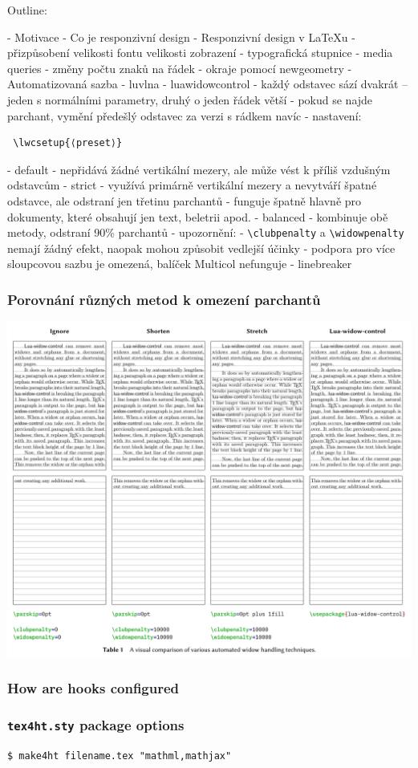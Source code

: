 
Outline:

- Motivace
- Co je responzivní design
- Responzivní design v LaTeXu
  - přizpůsobení velikosti fontu velikosti zobrazení
  - typografická stupnice
  - media queries
    - změny počtu znaků na řádek
    - okraje pomocí newgeometry
- Automatizovaná sazba
  - luvlna
  - luawidowcontrol
    - každý odstavec sází dvakrát -- jeden s normálními parametry, druhý o jeden řádek větší
    - pokud se najde parchant, vymění předešlý odstavec za verzi s rádkem navíc
    - nastavení:
 \begin{verbatim}
 \lwcsetup{⟨preset⟩}
 \end{verbatim}
      - default - nepřidává žádné vertikální mezery, ale může vést k příliš vzdušným odstavcům
      - strict - využívá primárně vertikální mezery a nevytváří špatné odstavce,  ale odstraní jen třetinu parchantů
        - funguje špatně hlavně pro dokumenty, které obsahují jen text, beletrii apod.
      - balanced - kombinuje obě metody, odstraní 90\% parchantů
    - upozornění:
      - \verb|\clubpenalty| a \verb|\widowpenalty| nemají žádný efekt, naopak mohou způsobit vedlejší účinky
      - podpora pro více sloupcovou sazbu je omezená, balíček Multicol nefunguje
  - linebreaker

 
\begin{frame}
  \frametitle{Porovnání různých metod k omezení parchantů}
  \begin{center}
  \includegraphics[height=.95\textheight]{img/lua-widow.pdf}
  \end{center}
\end{frame}



\begin{frame}
  \frametitle{How are hooks configured}
  \begin{itemize}

\end{itemize}
\end{frame}

\begin{frame}[fragile]
  \frametitle{\texttt{tex4ht.sty} package options}
  \begin{priklad}
\begin{verbatim}
$ make4ht filename.tex "mathml,mathjax"
\end{verbatim}
\end{priklad}
\end{frame}
